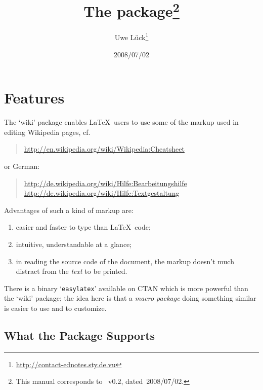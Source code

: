 \documentclass[pagesize=auto]{scrartcl}
\title{The \pkg{wiki} package\thanks{This manual corresponds to \pkg{wiki.sty}~v0.2, dated~2008/07/02.}}
\author{Uwe Lück\thanks{\url{http://contact-ednotes.sty.de.vu}}}
\date{2008/07/02}
\newcommand*{\pkg}[1]{\textsf{#1}}
\begin{document}
\maketitle

\section{Features}

The `\pkg{wiki}' package enables \LaTeX\ users to use some of the
markup used in editing Wikipedia pages, cf.
%
\begin{quote}
  \url{http://en.wikipedia.org/wiki/Wikipedia:Cheatsheet}
\end{quote}
%
or German:
%
\begin{quote}
  \url{http://de.wikipedia.org/wiki/Hilfe:Bearbeitungshilfe}\\
  \url{http://de.wikipedia.org/wiki/Hilfe:Textgestaltung}
\end{quote}

Advantages of such a kind of markup are:
%
\begin{enumerate}
\item easier and faster to type than \LaTeX\ code;

\item intuitive, understandable at a glance;

\item in reading the source code of the document,
  the markup doesn't much distract from the \emph{text}
  to be printed.
\end{enumerate}

There is a binary `\texttt{easylatex}' available on CTAN which is more
powerful than the `\pkg{wiki}' package; the idea here is that a \emph{macro
package} doing something similar is easier to use and to customize.


\subsection{What the Package Supports}
\end{document}
